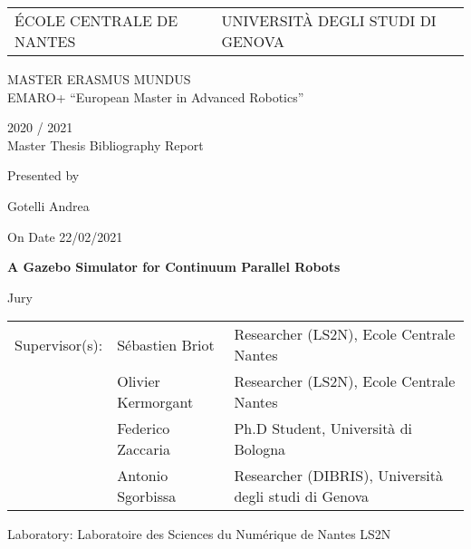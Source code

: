 \thispagestyle{empty}

\def\lskip{\vspace{0.5cm}}


\begin{tabular}{p{7cm}p{8cm}}
ÉCOLE CENTRALE DE NANTES
&
\raggedleft UNIVERSITÀ DEGLI STUDI DI GENOVA	
\end{tabular}

\vspace{2cm}


\begin{center} \large\sc MASTER ERASMUS MUNDUS \\ \normalsize{EMARO+ ``European Master in Advanced Robotics''} \end{center}


\begin{center}
	2020 / 2021\\
	\lskip
	Master Thesis Bibliography Report %
	\lskip
	
	Presented by \lskip 
	
	Gotelli Andrea \lskip
	
	On Date 22/02/2021\lskip\lskip
	
	{\Large \textbf{A Gazebo Simulator for Continuum Parallel Robots}}
	
	\vfill

Jury \lskip
		
	\end{center}
	


\begin{tabular}{p{3cm}p{7cm}p{5cm} }
  Supervisor(s):  	& Sébastien Briot & Researcher (LS2N), Ecole Centrale Nantes 	\\
		  			& Olivier Kermorgant & Researcher (LS2N), Ecole Centrale Nantes	\\
		  			& Federico Zaccaria & Ph.D Student, Università di Bologna	\\
					& Antonio Sgorbissa & Researcher (DIBRIS), Università degli studi di Genova  
\end{tabular}

\lskip

\begin{flushleft}
 Laboratory: Laboratoire des Sciences du Numérique de Nantes LS2N
\end{flushleft}

\newpage
\thispagestyle{empty}
\null
\newpage
\addtocounter{page}{-1}
\pagestyle{fancy}
